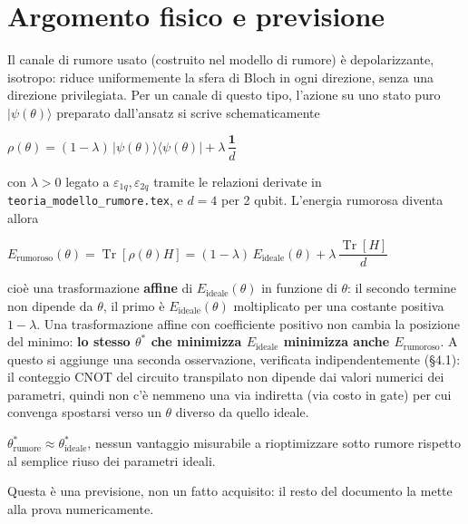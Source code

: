 \documentclass[11pt,a4paper]{article}
\newcommand{\Tr}{\operatorname{Tr}}
\newcommand{\ket}[1]{\lvert #1 \rangle}
\newcommand{\bra}[1]{\langle #1 \rvert}
\begin{document}
\section{Argomento fisico e previsione}

Il canale di rumore usato (costruito nel modello di rumore) è
depolarizzante, isotropo: riduce
uniformemente la sfera di Bloch in ogni direzione, senza una direzione
privilegiata. Per un canale di questo tipo, l'azione su uno stato puro
$\ket{\psi(\theta)}$ preparato dall'ansatz si scrive schematicamente

\begin{keyeq}
\centering
$\rho(\theta) = (1-\lambda)\,\ket{\psi(\theta)}\bra{\psi(\theta)} + \lambda\,\dfrac{\mathbf{1}}{d}$
\end{keyeq}

con $\lambda>0$ legato a $\varepsilon_{1q},\varepsilon_{2q}$ tramite le
relazioni derivate in \texttt{teoria\_modello\_rumore.tex}, e $d=4$ per 2
qubit. L'energia rumorosa diventa allora

\begin{keyeq}
\centering
$E_\text{rumoroso}(\theta) = \Tr[\rho(\theta) H] = (1-\lambda)\,E_\text{ideale}(\theta) + \lambda\,\dfrac{\Tr[H]}{d}$
\end{keyeq}

cioè una trasformazione \textbf{affine} di $E_\text{ideale}(\theta)$ in
funzione di $\theta$: il secondo termine non dipende da $\theta$, il
primo è $E_\text{ideale}(\theta)$ moltiplicato per una costante positiva
$1-\lambda$. Una trasformazione affine con coefficiente positivo non
cambia la posizione del minimo: \textbf{lo stesso $\theta^*$ che minimizza
$E_\text{ideale}$ minimizza anche $E_\text{rumoroso}$}. A questo si
aggiunge una seconda osservazione, verificata indipendentemente (§4.1):
il conteggio CNOT del circuito transpilato non dipende dai valori
numerici dei parametri, quindi non c'è nemmeno una via indiretta (via
costo in gate) per cui convenga spostarsi verso un $\theta$ diverso da
quello ideale.

\begin{keyeq}[title={Previsione dichiarata prima della verifica}]
\centering
$\theta^*_\text{rumore} \approx \theta^*_\text{ideale}$, nessun vantaggio
misurabile a rioptimizzare sotto rumore rispetto al semplice riuso dei
parametri ideali.
\end{keyeq}

Questa è una previsione, non un fatto acquisito: il resto del documento
la mette alla prova numericamente.
\end{document}
